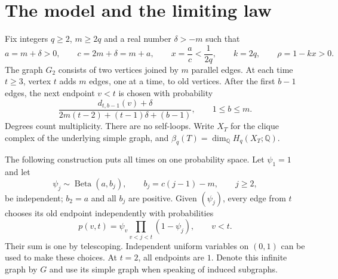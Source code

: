 \documentclass[11pt]{article}
\theoremstyle{remark}\newtheorem{remark}[theorem]{Remark}
\newcommand{\Q}{\mathbb Q}
\begin{document}
\section{The model and the limiting law}\label{sec:model}
Fix integers $q\ge2$, $m\ge2q$ and a real number $\delta>-m$ such that
\begin{equation}\label{eq:parameters}
 a=m+\delta>0,\qquad c=2m+\delta=m+a,\qquad
 x=\frac ac<\frac1{2q},\qquad k=2q,\qquad \rho=1-kx>0.
\end{equation}
The graph $G_2$ consists of two vertices joined by $m$ parallel edges.
At each time $t\ge3$, vertex $t$ adds $m$ edges, one at a time, to old
vertices. After the first $b-1$ edges, the next endpoint $v<t$ is chosen
with probability
\begin{equation}\label{eq:sequential}
 \frac{d_{t,b-1}(v)+\delta}
 {2m(t-2)+(t-1)\delta+(b-1)},\qquad 1\le b\le m.
\end{equation}
Degrees count multiplicity. There are no self-loops. Write $X_T$ for the
clique complex of the underlying simple graph, and
$\beta_q(T)=\dim_\Q H_q(X_T;\Q)$.

The following construction puts all times on one probability space.
Let $\psi_1=1$ and let
\begin{equation}\label{eq:beta}
 \psi_j\sim\operatorname{Beta}(a,b_j),\qquad
 b_j=c(j-1)-m,\qquad j\ge2,
\end{equation}
be independent; $b_2=a$ and all $b_j$ are positive.
Given $(\psi_j)$, every edge from $t$ chooses its old endpoint independently
with probabilities
\begin{equation}\label{eq:kernel}
 p(v,t)=\psi_v\prod_{v<j<t}(1-\psi_j),\qquad v<t.
\end{equation}
Their sum is one by telescoping. Independent uniform variables on $(0,1)$
can be used to make these choices. At $t=2$, all endpoints are $1$.
Denote this infinite graph by $G$ and use its simple graph when speaking
of induced subgraphs.
\end{document}

